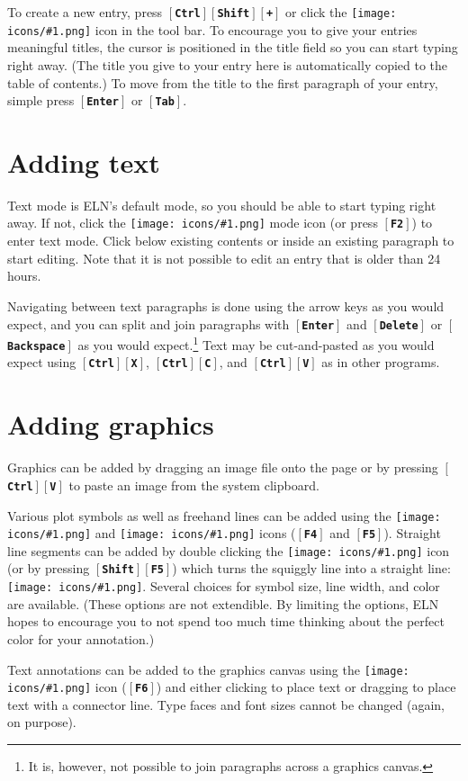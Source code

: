 \documentclass[11pt]{report}
\def\keystroke#1{$\left[\right.\!${\tt\bfseries #1}$\!\left.\right]$}
\def\key#1{\keystroke{#1}}
\def\keycombo#1#2{\keystroke{#1}\keystroke{#2}}
\def\keycontrol#1{\keycombo{Ctrl}{#1}}
\def\keyshift#1{\keycombo{Shift}{#1}}
\def\controlshift#1{\keystroke{Ctrl}\keystroke{Shift}\keystroke{#1}}
\def\icon#1{\raise-2pt\hbox{\texttt{[image: icons/\#1.png]}}}
\begin{document}
To create a new entry, press \controlshift{+} or click the
\icon{nav-plus} icon in the tool bar. To encourage you to give
your entries meaningful titles, the cursor is positioned in the title
field so you can start typing right away. (The title you give to your
entry here is automatically copied to the table of contents.) To move
from the title to the first paragraph of your entry, simple press
\key{Enter} or \key{Tab}.

\section{Adding text}

Text mode is ELN's default mode, so you should be able to start typing
right away. If not, click the \icon{type} mode icon (or press
\key{F2}) to enter text mode. Click below existing contents or inside
an existing paragraph to start editing. Note that it is not possible
to edit an entry that is older than 24 hours.

Navigating between text paragraphs is done using the arrow keys as you
would expect, and you can split and join paragraphs with \key{Enter}
and \key{Delete} or \key{Backspace} as you would expect.\footnote{It
  is, however, not possible to join paragraphs across a graphics
  canvas.} Text may be cut-and-pasted as you would expect using
\keycontrol{X}, \keycontrol{C}, and \keycontrol{V} as in other
programs.

\section{Adding graphics}

Graphics can be added by dragging an image file onto the page or by
pressing \keycontrol{V} to paste an image from the system
clipboard. 

Various plot symbols as well as freehand lines can be added using the
\icon{mark} and \icon{squiggle} icons (\key{F4} and
\key{F5}). Straight line segments can be added by double clicking the
\icon{squiggle} icon (or by pressing \keyshift{F5}) which turns the
squiggly line into a straight line: \icon{straight}. Several choices
for symbol size, line width, and color are available.  (These options
are not extendible. By limiting the options, ELN hopes to encourage
you to not spend too much time thinking about the perfect color for
your annotation.)

Text annotations can be added to the graphics canvas using the
\icon{note} icon (\key{F6}) and either clicking to place text or
dragging to place text with a connector line. Type faces and font
sizes cannot be changed (again, on purpose).
\end{document}
